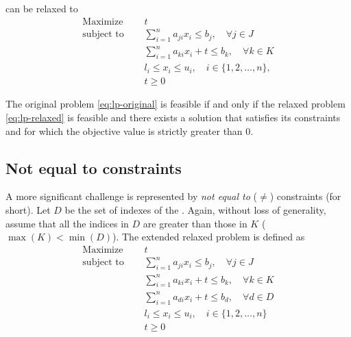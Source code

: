 \documentclass[runningheads]{llncs}
\begin{document}
can be relaxed to
\begin{equation}
    \label{eq:lp-relaxed}
    \begin{split}
        \text{Maximize }   \quad & t                                                             \\
        \text{subject to } \quad & \sum_{i=1}^{n} a_{ji}x_{i} \le b_j, \quad \forall j \in J     \\
        \quad                    & \sum_{i=1}^{n} a_{ki}x_{i} + t \le b_k, \quad \forall k \in K \\
        & l_i \le x_i \le u_i,  \quad i \in \{1, 2, \ldots, n\},        \\
        & t \ge 0
    \end{split}
\end{equation}

\begin{theorem}
    \label{thm:lp-relaxed}
    The original problem \eqref{eq:lp-original} is feasible if and only if the relaxed problem \eqref{eq:lp-relaxed} is feasible and there exists a solution that satisfies its constraints and for which the objective value is strictly greater than $0$.
\end{theorem}

\subsection{Not equal to constraints}

A more significant challenge is represented by \textit{not equal to} ($\ne$) constraints (\nqcs for short).
Let $D$ be the set of indexes of the \nqcs.
Again, without loss of generality, assume that all the indices in $D$ are greater than those in $K$ ($\max(K) < \min(D)$).
The extended relaxed problem is defined as
\begin{equation}
    \label{eq:lp-extended}
    \begin{split}
        \text{Maximize }   \quad & t                                                             \\
        \text{subject to } \quad & \sum_{i=1}^{n} a_{ji}x_{i} \le b_j, \quad \forall j \in J     \\
        \quad                    & \sum_{i=1}^{n} a_{ki}x_{i} + t \le b_k, \quad \forall k \in K \\
        \quad                    & \sum_{i=1}^{n} a_{di}x_{i} + t \le b_d, \quad \forall d \in D \\
        & l_i \le x_i \le u_i,  \quad i \in \{1, 2, \ldots, n\}         \\
        & t \ge 0
    \end{split}
\end{equation}
\end{document}
